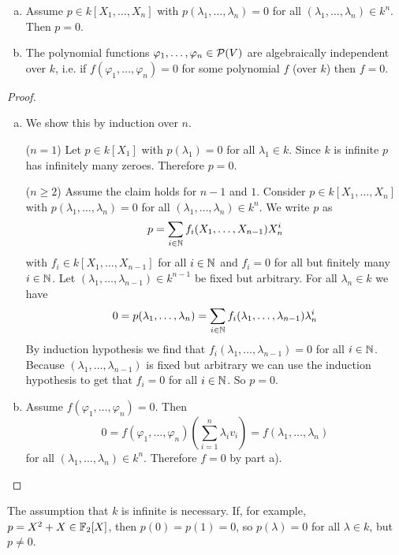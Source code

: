 \begin{lem}\leavevmode
 \begin{enumerate}[a)]
  \item
   Assume $p \in k[X_1, \ldots, X_n]$ with $p(\lambda_1, \ldots, \lambda_n) = 0$ for all $(\lambda_1,\ldots,\lambda_n) \in k^n$. Then $p = 0$.
  \item
   The polynomial functions $\varphi_1, \ldots, \varphi_n \in \mathcal{P}(V)$ are algebraically independent over $k$, i.e. if $f(\varphi_1, \ldots, \varphi_n) = 0$ for some polynomial $f$ (over $k$) then $f = 0$.
 \end{enumerate}
\end{lem}
\begin{proof}\leavevmode
 \begin{enumerate}[a)]
  \item
   We show this by induction over $n$.
   
   ($n = 1$) Let $p \in k[X_1]$ with $p(\lambda_1) = 0$ for all $\lambda_1 \in k$. Since $k$ is infinite $p$ has infinitely many zeroes. Therefore $p = 0$.
   
   ($n \geq 2$) Assume the claim holds for $n-1$ and $1$. Consider $p \in k[X_1, \ldots, X_n]$ with $p(\lambda_1, \ldots, \lambda_n) = 0$ for all $(\lambda_1, \ldots, \lambda_n) \in k^n$. We write $p$ as
   \[
    p = \sum_{i \in \mathbb{N}} f_i(X_1, \ldots, X_{n-1}) X_n^i
   \]
   with $f_i \in k[X_1, \ldots, X_{n-1}]$ for all $i \in \mathbb{N}$ and $f_i = 0$ for all but finitely many $i \in \mathbb{N}$. Let $(\lambda_1, \ldots, \lambda_{n-1}) \in k^{n-1}$ be fixed but arbitrary. For all $\lambda_n \in k$ we have
   \[
    0 = p(\lambda_1, \ldots, \lambda_n) = \sum_{i \in \mathbb{N}} f_i(\lambda_1, \ldots, \lambda_{n-1}) \lambda_n^i
   \]
   By induction hypothesis we find that $f_i(\lambda_1, \ldots, \lambda_{n-1}) = 0$ for all $i \in \mathbb{N}$. Because $(\lambda_1, \ldots, \lambda_{n-1})$ is fixed but arbitrary we can use the induction hypothesis to get that $f_i = 0$ for all $i \in \mathbb{N}$. So $p = 0$.
  \item
   Assume $f(\varphi_1, \ldots, \varphi_n) = 0$. Then
   \[
    0 = f(\varphi_1, \ldots, \varphi_n)\left(\sum_{i=1}^n \lambda_i v_i\right) = f(\lambda_1, \ldots, \lambda_n)
   \]
   for all $(\lambda_1, \ldots, \lambda_n) \in k^n$. Therefore $f = 0$ by part a). \qedhere
 \end{enumerate}
\end{proof}

\begin{warn}
 The assumption that $k$ is infinite is necessary. If, for example, $p = X^2+X \in \mathbb{F}_2[X]$, then $p(0) = p(1) = 0$, so $p(\lambda)=0$ for all $\lambda \in k$, but $p \neq 0$.
\end{warn}


